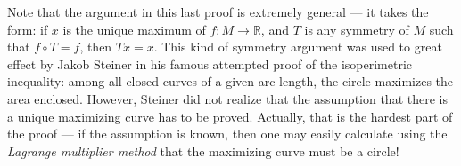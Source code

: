 \documentclass[12pt]{article}
\newcommand{\real}{\mathbb{R}}
\begin{document}
Note that the argument in this last proof
is extremely general --- it takes the form:
if $x$ is the unique maximum of $f \colon M \to \real$,
and $T$ is any symmetry of $M$ such that $f \circ T = f$,
then $Tx = x$.  This kind of symmetry argument was used to great effect
by Jakob Steiner in his famous attempted proof of the isoperimetric inequality:
among all closed curves of a given arc length, the circle maximizes
the area enclosed.  However, Steiner did not realize that
the assumption that there is a unique maximizing curve
has to be proved.  Actually, that is the hardest part of the proof ---
if the assumption is known, then one may easily calculate using the \emph{Lagrange multiplier method}
that the maximizing curve must be a circle!

\end{document}
